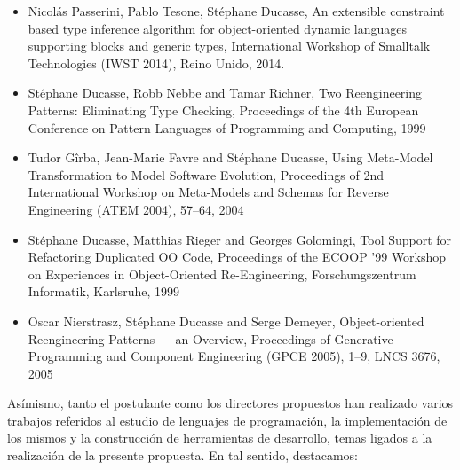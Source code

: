 \documentclass[a4paper,10pt]{article}
\begin{document}
\begin{itemize}
 \item Nicolás Passerini, Pablo Tesone, Stéphane Ducasse, An extensible constraint based type inference
algorithm for object-oriented dynamic languages supporting blocks and generic types, International Workshop of Smalltalk Technologies (IWST 2014), Reino Unido, 2014.
 
 \item Stéphane Ducasse, Robb Nebbe and Tamar Richner, Two Reengineering Patterns: Eliminating Type Checking, Proceedings of the 4th European Conference on Pattern Languages of Programming and Computing, 1999
 
 \item Tudor Gîrba, Jean-Marie Favre and Stéphane Ducasse, Using Meta-Model Transformation to Model Software Evolution, Proceedings of 2nd International Workshop on Meta-Models and Schemas for Reverse Engineering (ATEM 2004), 57–64, 2004
 
 \item Stéphane Ducasse, Matthias Rieger and Georges Golomingi, Tool Support for Refactoring Duplicated OO Code, Proceedings of the ECOOP '99 Workshop on Experiences in Object-Oriented Re-Engineering, Forschungszentrum Informatik, Karlsruhe, 1999
 
 \item Oscar Nierstrasz, Stéphane Ducasse and Serge Demeyer, Object-oriented Reengineering Patterns — an Overview, Proceedings of Generative Programming and Component Engineering (GPCE 2005), 1–9, LNCS 3676, 2005
 
\end{itemize}

Asímismo, tanto el postulante como los directores propuestos han realizado varios trabajos referidos al estudio de lenguajes de programación, la implementación de los mismos y la construcción de herramientas de desarrollo, temas ligados a la realización de la presente propuesta. En tal sentido, destacamos:
\end{document}
